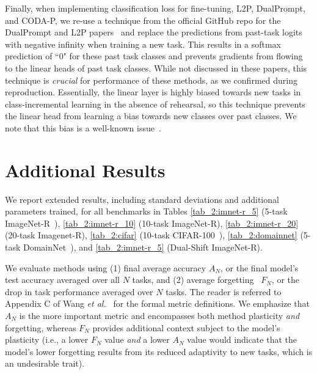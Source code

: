 Finally, when implementing classification loss for fine-tuning, L2P, DualPrompt, and CODA-P, we re-use a technique from the official GitHub repo for the DualPrompt and L2P papers~\cite{wang2022learning,wang2022dualprompt} and replace the predictions from past-task logits with negative infinity when training a new task. This results in a softmax prediction of ``0" for these past task classes and prevents gradients from flowing to the linear heads of past task classes. While not discussed in these papers, this technique is \emph{crucial} for performance of these methods, as we confirmed during reproduction. Essentially, the linear layer is highly biased towards new tasks in class-incremental learning in the absence of rehearsal, so this technique prevents the linear head from learning a bias towards new classes over past classes. We note that this bias is a well-known issue~\cite{wu2019large,Ahn2021ssil}.

\section{Additional Results}
\label{appendix-metrics-and-results}




We report extended results, including standard deviations and additional parameters trained, for all benchmarks in Tables \ref{tab_2:imnet-r_5} (5-task ImageNet-R~\cite{hendrycks2021many,wang2022dualprompt}), \ref{tab_2:imnet-r_10} (10-task ImageNet-R), \ref{tab_2:imnet-r_20} (20-task Imagenet-R), \ref{tab_2:cifar} (10-task CIFAR-100~\cite{krizhevsky2009learning}), \ref{tab_2:domainnet} (5-task DomainNet~\cite{peng2019moment}), and \ref{tab_2:imnet-r_5} (Dual-Shift ImageNet-R).

We evaluate methods using (1) final average accuracy $A_{N}$, or the final model's test accuracy averaged over all $N$ tasks, and (2) average forgetting~\cite{chaudhry2018efficient,Lopez-Paz:2017,mai2022online} $F_{N}$, or the drop in task performance averaged over $N$ tasks. The reader is referred to Appendix C of Wang \emph{et al.}~\cite{wang2022dualprompt} for the formal metric definitions.
We emphasize that $A_{N}$ is the more important metric and encompasses both method plasticity \emph{and} forgetting, 
whereas $F_{N}$ provides additional context subject to the model's plasticity (i.e., a lower $F_{N}$ value \emph{and} a lower $A_{N}$ value would indicate that the model's lower forgetting results from its reduced adaptivity to new tasks, which is an undesirable trait).

